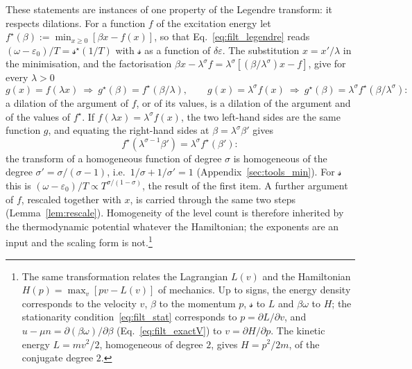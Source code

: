 \documentclass[10pt,a4paper]{article}
\theoremstyle{plain}
\newcommand{\lds}{\mathscr{s}}  %
\begin{document}
These statements are instances of one property of the Legendre transform:
it respects dilations. For a function $f$ of the excitation energy let
$f^{\star}(\beta):=\min_{x\ge0}[\beta x-f(x)]$, so that
Eq.~\eqref{eq:filt_legendre} reads
$(\omega-\varepsilon_0)/T=\lds^{\star}(1/T)$ with $\lds$ as a function of
$\delta\varepsilon$. The substitution $x=x'/\lambda$ in the minimisation,
and the factorisation $\beta x-\lambda^{\sigma}f=\lambda^{\sigma}[(\beta/\lambda^{\sigma})x-f]$,
give for every $\lambda>0$
\begin{equation}\label{eq:filt_dilation}
  g(x)=f(\lambda x)\ \Rightarrow\ g^{\star}(\beta)=f^{\star}(\beta/\lambda) ,
  \qquad
  g(x)=\lambda^{\sigma}f(x)\ \Rightarrow\ g^{\star}(\beta)=\lambda^{\sigma}f^{\star}(\beta/\lambda^{\sigma}) :
\end{equation}
a dilation of the argument of $f$, or of its values, is a dilation of the
argument and of the values of $f^{\star}$. If
$f(\lambda x)=\lambda^{\sigma}f(x)$, the two left-hand sides are the same
function $g$, and equating the right-hand sides at
$\beta=\lambda^{\sigma}\beta'$ gives
\[
  f^{\star}(\lambda^{\sigma-1}\beta')=\lambda^{\sigma}f^{\star}(\beta') :
\]
the transform of a homogeneous function of degree $\sigma$ is homogeneous
of the degree $\sigma'=\sigma/(\sigma-1)$, i.e.\ $1/\sigma+1/\sigma'=1$
(Appendix~\ref{sec:tools_min}). For $\lds$ this is
$(\omega-\varepsilon_0)/T\propto T^{\sigma/(1-\sigma)}$, the result of the
first item. A further argument of $f$, rescaled together with $x$, is
carried through the same two steps (Lemma~\ref{lem:rescale}). Homogeneity of the level count is therefore
inherited by the thermodynamic potential whatever the Hamiltonian; the
exponents are an input and the scaling form is not.\footnote{The same
transformation relates the Lagrangian $L(v)$ and the Hamiltonian
$H(p)=\max_v[pv-L(v)]$ of mechanics. Up to signs, the energy density
corresponds to the velocity $v$, $\beta$ to the momentum $p$, $\lds$ to $L$
and $\beta\omega$ to $H$; the stationarity condition~\eqref{eq:filt_stat}
corresponds to $p=\partial L/\partial v$, and
$u-\mu n=\partial(\beta\omega)/\partial\beta$ (Eq.~\eqref{eq:filt_exactV}) to
$v=\partial H/\partial p$. The kinetic energy $L=mv^{2}/2$, homogeneous of
degree $2$, gives $H=p^{2}/2m$, of the conjugate degree $2$.}
\end{document}
